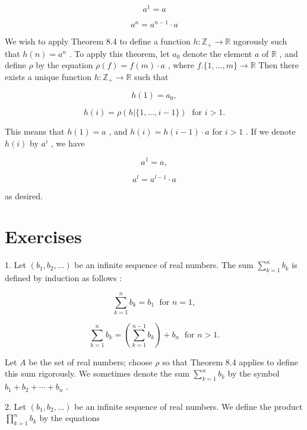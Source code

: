 \begin{theorem}
\begin{centeredblock}
\begin{example}
\[
{a}^{1} = a
\]

\[
{a}^{n} = {a}^{n - 1} \cdot  a
\]

We wish to apply Theorem 8.4 to define a function \(h : {\mathbb{Z}}_{ + } \rightarrow  \mathbb{R}\) ngorously such that \(h\left( n\right)  = {a}^{n}\) . To apply this theorem, let \({a}_{0}\) denote the element \(a\) of \(\mathbb{R}\) , and define \(\rho\) by the equation \(\rho \left( f\right)  = f\left( m\right)  \cdot  a\) , where \(f.\{ 1,\ldots ,m\}  \rightarrow  \mathbb{R}\) Then there exists a unique function \(h : {\mathbb{Z}}_{ + } \rightarrow  \mathbb{R}\) such that

\[
h\left( 1\right)  = {a}_{0},
\]

\[
h\left( i\right)  = \rho \left( {h|\{ 1,\ldots ,i - 1\} }\right) \;\text{ for }i > 1.
\]

This means that \(h\left( 1\right)  = a\) , and \(h\left( i\right)  = h\left( {i - 1}\right)  \cdot  a\) for \(i > 1\) . If we denote \(h\left( i\right)\) by \({a}^{i}\) , we have

\[
{a}^{1} = a,
\]

\[
{a}^{l} = {a}^{l - 1} \cdot  a
\]

as desired.
\end{example}
\end{centeredblock}

\section*{Exercises}

1. Let \(\left( {{b}_{1},{b}_{2},\ldots }\right)\) be an infinite sequence of real numbers. The sum \(\mathop{\sum }\limits_{{k = 1}}^{n}{b}_{k}\) is defined by induction as follows :

\[
\mathop{\sum }\limits_{{k = 1}}^{n}{b}_{k} = {b}_{1}\;\text{ for }n = 1,
\]

\[
\mathop{\sum }\limits_{{k = 1}}^{n}{b}_{k} = \left( {\mathop{\sum }\limits_{{k = 1}}^{{n - 1}}{b}_{k}}\right)  + {b}_{n}\;\text{ for }n > 1.
\]

Let \(A\) be the set of real numbers; choose \(\rho\) so that Theorem 8.4 applies to define this sum rigorously. We sometimes denote the sum \(\mathop{\sum }\limits_{{k = 1}}^{n}{b}_{k}\) by the symbol \({b}_{1} + {b}_{2} + \cdots  + {b}_{n}\) .

2. Let \(\left( {{b}_{1},{b}_{2},\ldots }\right)\) be an infinite sequence of real numbers. We define the product \(\mathop{\prod }\limits_{{k = 1}}^{n}{b}_{k}\) by the equations


\end{theorem}

